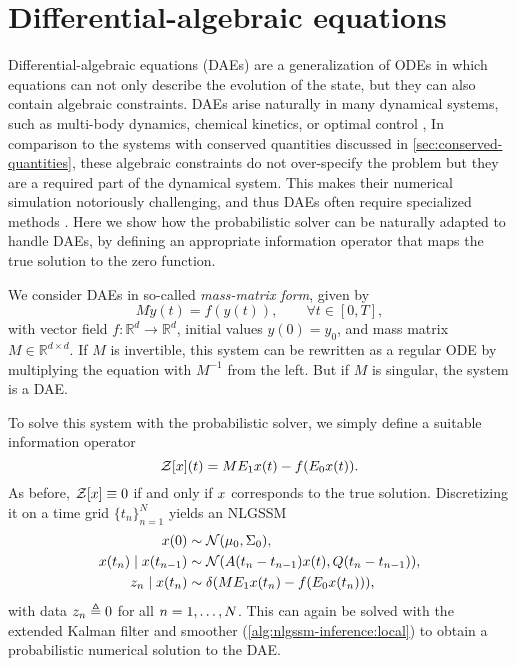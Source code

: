 \documentclass{mimosis}
\begin{document}
\section{Differential-algebraic equations}
\label{sec:orgdd92651}
\label{sec:daes}
Differential-algebraic equations (DAEs) are a generalization of ODEs in which equations can not only describe the evolution of the state, but they can also contain algebraic constraints.
DAEs arise naturally in many dynamical systems, such as multi-body dynamics, chemical kinetics, or optimal control \parencite{brenan1996numerical},
In comparison to the systems with conserved quantities discussed in \cref{sec:conserved-quantities}, these algebraic constraints do not over-specify the problem but they are a required part of the dynamical system.
This makes their numerical simulation notoriously challenging, and thus DAEs often require specialized methods \parencite{daesarenotodes}.
Here we show how the probabilistic solver can be naturally adapted to handle DAEs, by defining an appropriate information operator that maps the true solution to the zero function.

We consider DAEs in so-called \emph{mass-matrix form}, given by
\begin{equation} \label{eq:dae}
  M \dot{y}(t) = f \left( y(t) \right), \qquad \forall t \in [0, T],
\end{equation}
with vector field \(f : \mathbb{R}^{d} \to \mathbb{R}^d\), initial values \(y(0) = y_0\),
and mass matrix \(M \in \mathbb{R}^{d \times d}\).
If \(M\) is invertible, this system can be rewritten as a regular ODE by multiplying the equation with \(M^{-1}\) from the left.
But if \(M\) is singular, the system is a DAE.

To solve this system with the probabilistic solver, we simply define a suitable information operator
\begin{equation}
  \label{eq:dae-infoop}
  \mathcal{Z}[\st](t) = M \proj{1} \st(t) - f \left( \proj{0} \st(t) \right).
\end{equation}
As before, \(\mathcal{Z}[x] \equiv 0\) if and only if \(x\) corresponds to the true solution.
Discretizing it on a time grid \(\{t_n\}_{n=1}^N\) yields an NLGSSM
\begin{subequations}
\begin{align}
  \st(0) &\sim \N( \mu_0, \Sigma_0 ), \\
  \st(t_\idxt) \mid \st(t_{\idxt-1}) &\sim \N( \transA(t_\idxt - t_{\idxt-1}) \st(t), \transC(t_\idxt - t_{\idxt-1}) ), \\
  \sobs_\idxt \mid \st(t_\idxt) &\sim \dirac( M \proj{1} \st(t_\idxt) - f \left( \proj{0} \st(t_\idxt) \right) ),
\end{align}
\end{subequations}
with data \(z_n \triangleq 0\) for all \(n = 1, \dots, N\).
This can again be solved with the extended Kalman filter and smoother (\cref{alg:nlgssm-inference:local}) to obtain a probabilistic numerical solution to the DAE.
\end{document}
